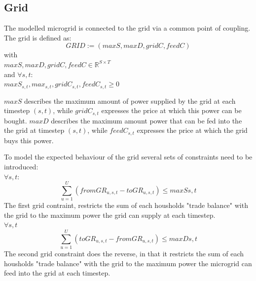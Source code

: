 \documentclass[
	11pt,								%
	DIV10,								%
	a4paper,         					%
	oneside,							%
	headheight=20pt,					%
	footheight=20pt,					%
    parskip=full,						%
    listof=totoc,						%
	bibliography=totoc,					%
	index=totoc,						%
]{scrartcl}
\begin{document}
\subsection{Grid}
The modelled microgrid is connected to the grid via a common point of coupling. The grid is defined as:
\begin{equation}
	GRID:= (maxS, maxD, gridC, feedC)
\end{equation}
with\\
$maxS,maxD, gridC, feedC \in \mathbb{R}^{S \times T}$\\
and $\forall s,t$: \\
$maxS_{s,t}, max_{s,t}, gridC_{s,t}, feedC_{s,t} \geq 0$

$maxS$ describes the maximum amount of power supplied by the grid at each timestep $(s,t)$, while $gridC_{s,t}$ expresses the price at which this power can be bought.
$maxD$ describes the maximum amount power that can be fed into the the grid at timestep $(s,t)$, while $feedC_{s,t}$ expresses the price at which the grid buys this power. 

To model the expected behaviour of the grid several sets of constraints need to be introduced:
\\
$\forall s,t$:
\begin{equation}
	\sum_{u=1}^{U}(fromGR_{u,s,t}-toGR_{u,s,t}) \leq maxS{s,t}
\end{equation}
The first grid contraint, restricts the sum of each housholds "trade balance" with the grid to the maximum power the grid can supply at each timestep.
\\
$\forall s,t$
\begin{equation}
	\sum_{u=1}^{U}(toGR_{u,s,t}-fromGR_{u,s,t}) \leq maxD{s,t}
\end{equation}
The second grid constraint does the reverse, in that it restricts the sum of each housholds "trade balance" with the grid to the maximum power the microgrid can feed into the grid at each timestep.
\end{document}
